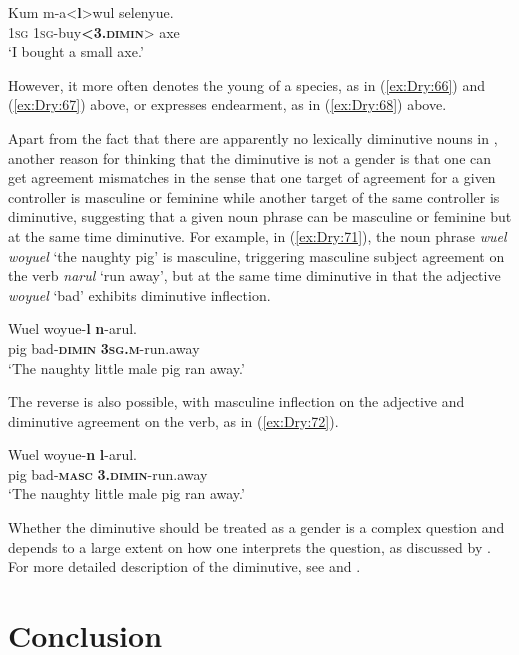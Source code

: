 \documentclass[output=collectionpaper]{langsci/langscibook}
\begin{document}
\ea \label{ex:Dry:69}
\gll Kum	m-a<\textbf{l}>wul	selenyue.\\
\textsc{1sg} \textsc{1sg}-buy\textbf{<\textsc{3.dimin}}> axe\\
\glt `I bought a small axe.'
\z

However, it more often denotes the young of a species, as in (\ref{ex:Dry:66}) and (\ref{ex:Dry:67}) above, or expresses endearment, as in (\ref{ex:Dry:68}) above.

Apart from the fact that there are apparently no lexically diminutive nouns in , another reason for thinking that the  diminutive is not a gender is that one can get agreement mismatches in the sense that one target of agreement for a given controller is masculine or feminine while another target of the same controller is diminutive, suggesting that a given noun phrase can be masculine or feminine but at the same time diminutive. For example, in (\ref{ex:Dry:71}), the noun phrase \textit{wuel woyuel} `the naughty pig' is masculine, triggering masculine subject agreement on the verb \textit{narul} `run away', but at the same time diminutive in that the adjective \textit{woyuel} `bad' exhibits diminutive inflection.

\ea \label{ex:Dry:71}
\gll Wuel	woyue-\textbf{l}	\textbf{n}-arul.\\
pig bad-\textbf{\textsc{dimin}} \textbf{\textsc{3sg.m}}-run.away\\
\glt `The naughty little male pig ran away.'
\z

The reverse is also possible, with masculine inflection on the adjective and diminutive agreement on the verb, as in (\ref{ex:Dry:72}).

\ea \label{ex:Dry:72}
\gll Wuel	woyue-\textbf{n}	\textbf{l}-arul.\\
pig bad-\textbf{\textsc{masc}} \textbf{\textsc{3.dimin}}-run.away\\
\glt `The naughty little male pig ran away.'
\z

Whether the  diminutive should be treated as a gender is a complex question and depends to a large extent on how one interprets the question, as discussed by \citet{Dryer2016}. For more detailed description of the  diminutive, see \citet{DryerUnderrevision} and \citet{DryerInpreparation}.

\section{Conclusion}
\end{document}
